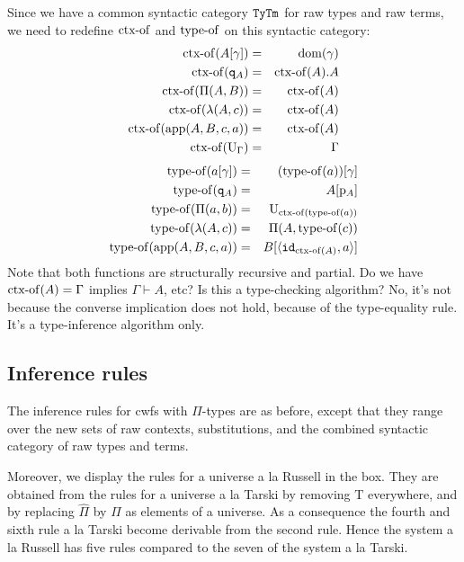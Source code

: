 \documentclass{lmcs}
\def\UU{\mathrm{U}}
\def\Ta{\mathrm{T}}
\def\Pihat{\hat{\Pi}}
\begin{document}
Since we have a common syntactic category ${\tt Ty}{\tt Tm}$ for raw types and raw terms, we need to redefine
$\operatorname{ctx-of}$ and $\operatorname{type-of}$ on this syntactic category:
\begin{eqnarray*}
\ctxof(A[\gamma]) &=& \dom(\gamma)\\
\ctxof(\qI_A) &=& \ctxof(A).A\\
\ctxof(\Pi(A,B)) &=& \ctxof(A)\\
\ctxof(\lambda(A,c)) &=& \ctxof(A)\\
\ctxof(\ap(A,B,c,a)) &=&\ctxof(A)\\
\ctxof(\UU_\Gamma) &=& \Gamma\\
\end{eqnarray*}
\begin{eqnarray*}
\typeof(a[\gamma]) &=& (\typeof(a))[\gamma]\\
\typeof(\qI_A) &=& A[\p_{A}]\\
\typeof(\Pi(a,b))&=& \UU_{\ctxof(\typeof(a))}\\
\typeof(\lambda(A,c)) &=& \Pi(A,\typeof(c))\\
\typeof(\ap(A,B,c,a)) &=& B[\langle \id_{\ctxof(A)},a \rangle ]
\end{eqnarray*}
Note that both functions are structurally recursive and partial. Do we have $\operatorname{ctx-of}(A) = \Gamma$ implies $\Gamma \vdash A$, etc? Is this a type-checking algorithm? No, it's not because the converse implication does not hold, because of the type-equality rule. It's a type-inference algorithm only.


\subsection{Inference rules}
The inference rules for cwfs with $\Pi$-types are as before, except that they range over the new sets of raw contexts, substitutions, and the combined syntactic category of raw types and terms. 

Moreover, we display the rules for a universe a la Russell in the box. They are obtained from the rules for a universe a la Tarski by removing $\Ta$ everywhere, and by replacing $\Pihat$ by $\Pi$ as elements of a universe. As a consequence the fourth and sixth rule a la Tarski become derivable from the second rule. Hence the system a la Russell has five rules compared to the seven of the system a la Tarski.
\end{document}

